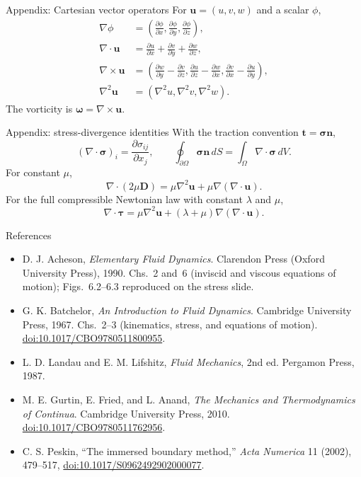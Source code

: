 \documentclass[aspectratio=169,11pt]{beamer}
\newcommand{\uvec}{\bm{u}}
\newcommand{\nvec}{\bm{n}}
\newcommand{\tvec}{\bm{t}}
\newcommand{\stress}{\bm{\sigma}}
\newcommand{\taustress}{\bm{\tau}}
\newcommand{\Dtensor}{\mathbf{D}}
\begin{document}
\begin{frame}{Appendix: Cartesian vector operators}
For $\uvec=(u,v,w)$ and a scalar $\phi$,
\begin{align*}
  \nabla\phi
  &=\left(
  \frac{\partial\phi}{\partial x},
  \frac{\partial\phi}{\partial y},
  \frac{\partial\phi}{\partial z}
  \right),\\[5pt]
  \nabla\cdot\uvec
  &=\frac{\partial u}{\partial x}
  +\frac{\partial v}{\partial y}
  +\frac{\partial w}{\partial z},\\[5pt]
  \nabla\times\uvec
  &=\left(
  \frac{\partial w}{\partial y}-\frac{\partial v}{\partial z},
  \frac{\partial u}{\partial z}-\frac{\partial w}{\partial x},
  \frac{\partial v}{\partial x}-\frac{\partial u}{\partial y}
  \right),\\[5pt]
  \nabla^2\uvec
  &=\left(\nabla^2u,\nabla^2v,\nabla^2w\right).
\end{align*}
The vorticity is $\bm{\omega}=\nabla\times\uvec$.
\end{frame}

\begin{frame}{Appendix: stress-divergence identities}
With the traction convention $\tvec=\stress\nvec$,
\[
  (\nabla\cdot\stress)_i
  =\frac{\partial\sigma_{ij}}{\partial x_j},
  \qquad
  \oint_{\partial\Omega}\stress\nvec\,dS
  =\int_\Omega\nabla\cdot\stress\,dV.
\]
For constant $\mu$,
\[
  \nabla\cdot(2\mu\Dtensor)
  =\mu\nabla^2\uvec
  +\mu\nabla(\nabla\cdot\uvec).
\]
For the full compressible Newtonian law with constant $\lambda$ and $\mu$,
\[
  \nabla\cdot\taustress
  =\mu\nabla^2\uvec
  +(\lambda+\mu)\nabla(\nabla\cdot\uvec).
\]
\end{frame}

\begin{frame}{References}
\small
\begin{itemize}\itemsep7pt
  \item D. J. Acheson, \emph{Elementary Fluid Dynamics}. Clarendon Press (Oxford University Press), 1990.
  Chs.~2 and~6 (inviscid and viscous equations of motion); Figs.~6.2--6.3 reproduced on the stress slide.
  \item G. K. Batchelor, \emph{An Introduction to Fluid Dynamics}. Cambridge University Press, 1967.
  Chs.~2--3 (kinematics, stress, and equations of motion). \href{https://doi.org/10.1017/CBO9780511800955}{doi:10.1017/CBO9780511800955}.
  \item L. D. Landau and E. M. Lifshitz, \emph{Fluid Mechanics}, 2nd ed. Pergamon Press, 1987.
  \item M. E. Gurtin, E. Fried, and L. Anand, \emph{The Mechanics and Thermodynamics of Continua}. Cambridge University Press, 2010.
  \href{https://doi.org/10.1017/CBO9780511762956}{doi:10.1017/CBO9780511762956}.
  \item C. S. Peskin, ``The immersed boundary method,'' \emph{Acta Numerica} 11 (2002), 479--517, \href{https://doi.org/10.1017/S0962492902000077}{doi:10.1017/S0962492902000077}.
\end{itemize}
\end{frame}
\end{document}
